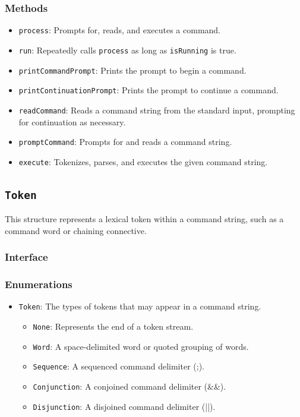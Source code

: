 \documentclass{article}
\begin{document}
  \subsubsection{Methods}
  \begin{itemize}
    \item \texttt{process}: Prompts for, reads, and executes a command.
    \item \texttt{run}: Repeatedly calls \texttt{process} as long as
      \texttt{isRunning} is true.
    \item \texttt{printCommandPrompt}: Prints the prompt to begin a
      command.
    \item \texttt{printContinuationPrompt}: Prints the prompt to
      continue a command.
    \item \texttt{readCommand}: Reads a command string from the standard
      input, prompting for continuation as necessary.
    \item \texttt{promptCommand}: Prompts for and reads a command string.
    \item \texttt{execute}: Tokenizes, parses, and executes the given
      command string.
  \end{itemize}

  \subsection{\texttt{Token}}

  This structure represents a lexical token within a command string,
  such as a command word or chaining connective.

  \subsubsection{Interface}
  

  \subsubsection{Enumerations}
  \begin{itemize}
    \item \texttt{Token}: The types of tokens that may appear in a
      command string.
      \begin{itemize}
        \item \texttt{None}: Represents the end of a token stream.
        \item \texttt{Word}: A space-delimited word or quoted grouping
          of words.
        \item \texttt{Sequence}: A sequenced command delimiter (;).
        \item \texttt{Conjunction}: A conjoined command delimiter (\&\&).
        \item \texttt{Disjunction}: A disjoined command delimiter (||).
      \end{itemize}
  \end{itemize}
\end{document}
